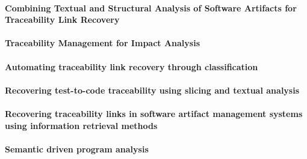 \paragraph*{Combining Textual and Structural Analysis of Software Artifacts for  Traceability Link Recovery}
\cite{McMillanPR2009}

\paragraph*{Traceability Management for Impact Analysis}
\cite{DelukaFR2008}

\paragraph*{Automating traceability link recovery through classification}
\cite{Mills:2017:ATL:3106237.3121280}

\paragraph*{Recovering test-to-code traceability using slicing and textual analysis} 
\cite{Qusef:2014:RTT:2747015.2747194}

\paragraph*{Recovering traceability links in software artifact management systems using information retrieval methods}
\cite{Lucia:2007:RTL:1276933.1276934}

\paragraph*{Semantic driven program analysis}
\cite{Marcus2004}






